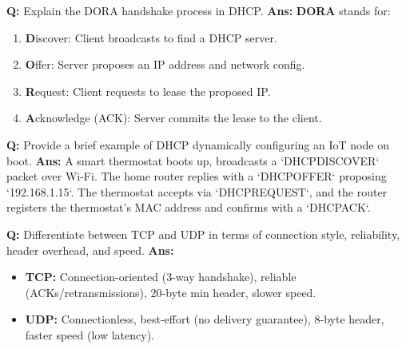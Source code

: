 \documentclass[10pt,a4paper,twocolumn]{article}
\begin{document}
\begin{tcolorbox}[
  colback=white,
  colframe=UnitColorThree,
  colbacktitle=gray!10!white,
  coltitle=black,
  fonttitle=\bfseries\sffamily\small,
  title={Unit III $\bullet$ Card 4},
  boxrule=1.2pt,
  arc=2mm,
  outer arc=2mm,
  boxsep=1.5mm,
  top=1mm,
  bottom=1mm,
  left=1.5mm,
  right=1.5mm,
  before skip=2.5mm,
  after skip=2.5mm
]
\textbf{Q:} Explain the DORA handshake process in DHCP.
\tcbline
\textbf{Ans:} \textbf{DORA} stands for:
\begin{enumerate}
  \item \textbf{D}iscover: Client broadcasts to find a DHCP server.
  \item \textbf{O}ffer: Server proposes an IP address and network config.
  \item \textbf{R}equest: Client requests to lease the proposed IP.
  \item \textbf{A}cknowledge (ACK): Server commits the lease to the client.
\end{enumerate}
\end{tcolorbox}


\begin{tcolorbox}[
  colback=white,
  colframe=UnitColorThree,
  colbacktitle=gray!10!white,
  coltitle=black,
  fonttitle=\bfseries\sffamily\small,
  title={Unit III $\bullet$ Card 5},
  boxrule=1.2pt,
  arc=2mm,
  outer arc=2mm,
  boxsep=1.5mm,
  top=1mm,
  bottom=1mm,
  left=1.5mm,
  right=1.5mm,
  before skip=2.5mm,
  after skip=2.5mm
]
\textbf{Q:} Provide a brief example of DHCP dynamically configuring an IoT node on boot.
\tcbline
\textbf{Ans:} A smart thermostat boots up, broadcasts a `DHCPDISCOVER` packet over Wi-Fi. The home router replies with a `DHCPOFFER` proposing `192.168.1.15`. The thermostat accepts via `DHCPREQUEST`, and the router registers the thermostat's MAC address and confirms with a `DHCPACK`.
\end{tcolorbox}


\begin{tcolorbox}[
  colback=white,
  colframe=UnitColorThree,
  colbacktitle=gray!10!white,
  coltitle=black,
  fonttitle=\bfseries\sffamily\small,
  title={Unit III $\bullet$ Card 6},
  boxrule=1.2pt,
  arc=2mm,
  outer arc=2mm,
  boxsep=1.5mm,
  top=1mm,
  bottom=1mm,
  left=1.5mm,
  right=1.5mm,
  before skip=2.5mm,
  after skip=2.5mm
]
\textbf{Q:} Differentiate between TCP and UDP in terms of connection style, reliability, header overhead, and speed.
\tcbline
\textbf{Ans:} \begin{itemize}
  \item \textbf{TCP:} Connection-oriented (3-way handshake), reliable (ACKs/retransmissions), 20-byte min header, slower speed.
  \item \textbf{UDP:} Connectionless, best-effort (no delivery guarantee), 8-byte header, faster speed (low latency).
\end{itemize}
\end{tcolorbox}
\end{document}
